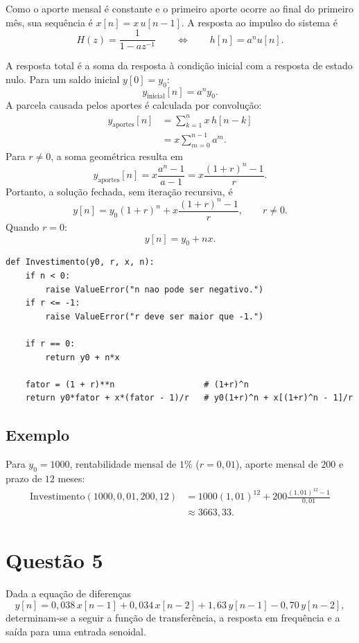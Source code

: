 \documentclass[12pt]{article}
\begin{document}
Como o aporte mensal é constante e o primeiro aporte ocorre ao final do primeiro
mês, sua sequência é $x[n]=x\,u[n-1]$. A resposta ao impulso do sistema é
\[
H(z)=\frac{1}{1-az^{-1}}
\qquad\Longleftrightarrow\qquad
h[n]=a^n u[n].
\]

A resposta total é a soma da resposta à condição inicial com a resposta de estado
nulo. Para um saldo inicial $y[0]=y_0$:
\[
y_{\mathrm{inicial}}[n]=a^n y_0.
\]
A parcela causada pelos aportes é calculada por convolução:
\[
\begin{aligned}
y_{\mathrm{aportes}}[n]
  &=\sum_{k=1}^{n}x\,h[n-k] \\
  &=x\sum_{m=0}^{n-1}a^m.
\end{aligned}
\]
Para $r\neq 0$, a soma geométrica resulta em
\[
y_{\mathrm{aportes}}[n]
=x\frac{a^n-1}{a-1}
=x\frac{(1+r)^n-1}{r}.
\]
Portanto, a solução fechada, sem iteração recursiva, é
\[
\boxed{
y[n]=y_0(1+r)^n+x\frac{(1+r)^n-1}{r}
},\qquad r\neq 0.
\]
Quando $r=0$:
\[
\boxed{y[n]=y_0+nx}.
\]

\begin{verbatim}
def Investimento(y0, r, x, n):
    if n < 0:
        raise ValueError("n nao pode ser negativo.")
    if r <= -1:
        raise ValueError("r deve ser maior que -1.")

    if r == 0:
        return y0 + n*x

    fator = (1 + r)**n                  # (1+r)^n
    return y0*fator + x*(fator - 1)/r   # y0(1+r)^n + x[(1+r)^n - 1]/r
\end{verbatim}

\subsection*{Exemplo}

Para $y_0=1000$, rentabilidade mensal de $1\%$ ($r=0{,}01$), aporte mensal de
$200$ e prazo de $12$ meses:
\[
\begin{aligned}
\mathrm{Investimento}(1000,0{,}01,200,12)
&=1000(1{,}01)^{12}
  +200\frac{(1{,}01)^{12}-1}{0{,}01}\\
&\approx 3663{,}33.
\end{aligned}
\]

\clearpage
\section*{Questão 5}

Dada a equação de diferenças
\[
y[n] = 0{,}038\,x[n-1] + 0{,}034\,x[n-2] + 1{,}63\,y[n-1] - 0{,}70\,y[n-2],
\]
determinam-se a seguir a função de transferência, a resposta em frequência e a
saída para uma entrada senoidal.
\end{document}
